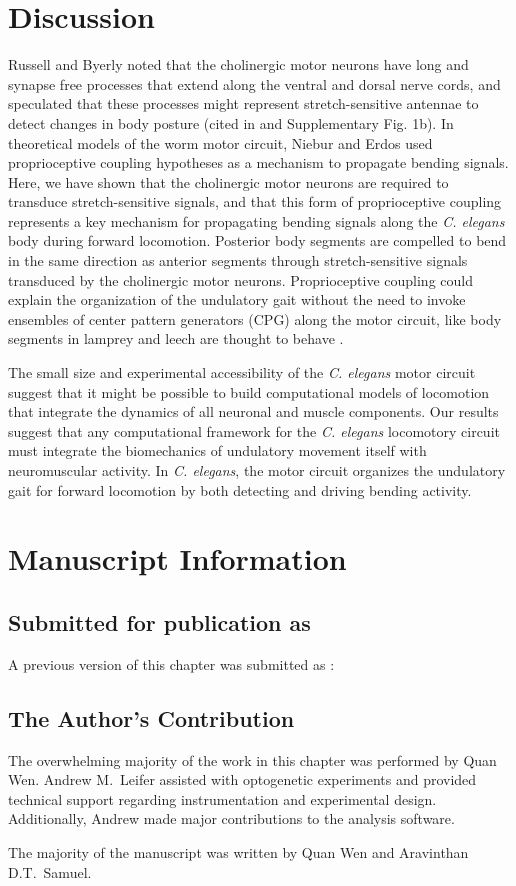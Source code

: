 \section{Discussion}
Russell and Byerly noted that the cholinergic motor neurons have long and synapse free 
processes that extend along the ventral and dorsal nerve cords, and speculated that these 
processes might represent stretch-sensitive antennae to detect changes in body posture (cited in 
 \citep{white_structure_1986,chen_neuronal_2007} and Supplementary Fig. 1b). In theoretical models of the worm motor circuit, 
Niebur and Erdos \citep{niebur_theory_1991} used proprioceptive coupling hypotheses as a mechanism to propagate 
bending signals. Here, we have shown that the cholinergic motor neurons are required to 
transduce stretch-sensitive signals, and that this form of proprioceptive coupling represents a key 
mechanism for propagating bending signals along the \textit{C. elegans} body during forward 
locomotion. Posterior body segments are compelled to bend in the same direction as anterior 
segments through stretch-sensitive signals transduced by the cholinergic motor neurons. 
Proprioceptive coupling could explain the organization of the undulatory gait without the need to 
invoke ensembles of center pattern generators (CPG) along the motor circuit, like body segments 
in lamprey and leech are thought to behave \citep{ermentrout_frequency_1984}.  
 
The small size and experimental accessibility of the \textit{C. elegans} motor circuit suggest that it might 
be possible to build computational models of locomotion that integrate the dynamics of all 
neuronal and muscle components. Our results suggest that any computational framework for the 
\textit{C. elegans} locomotory circuit must integrate the biomechanics of undulatory movement itself 
with neuromuscular activity. In \textit{C. elegans}, the motor circuit organizes the undulatory gait for forward locomotion by both detecting and driving bending activity.




\section{Manuscript Information}
\subsection{Submitted for publication as}
A previous version of this chapter was submitted as \citep{wen_bending_2011}:


\subsection{The Author's Contribution}
The overwhelming majority of the work in this chapter was performed by Quan Wen. Andrew M.~Leifer assisted with optogenetic experiments and provided technical support regarding instrumentation and experimental design. Additionally, Andrew made major contributions to the analysis software. 

The majority of the manuscript was written by Quan Wen and Aravinthan D.T.~Samuel.
